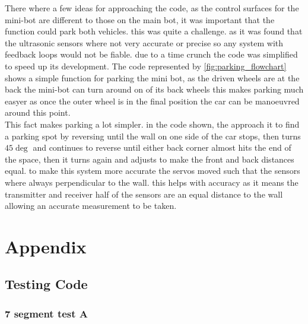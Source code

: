 There where a few ideas for approaching the code, as the control surfaces for the mini-bot are different to those on the main bot, it was important that the function could park both vehicles. this was quite a challenge. as it was found that the ultrasonic sensors where not very accurate or precise so any system with feedback loops would not be fiable. due to a time crunch the code was simplified to speed up its development. The code represented by \ref{fig:parking_flowchart} shows a simple function for parking the mini bot, as the driven wheels are at the back the mini-bot can turn around on of its back wheels this makes parking much easyer as once the outer wheel is in the final position the car can be manoeuvred around this point. \\

This fact makes parking a lot simpler. in the code shown, the approach it to find a parking spot by reversing until the wall on one side of the car stops, then turns $45\deg$ and continues to reverse until either back corner almost hits the end of the space, then it turns again and adjusts to make the front and back distances equal. to make this system more accurate the servos moved such that the sensors where always perpendicular to the wall. this helps with accuracy as it means the transmitter and receiver half of the sensors are an equal distance to the wall allowing an accurate measurement to be taken. 

	
	\chapter{Appendix}
	\section{Testing Code}

\subsection*{7 segment test A}

